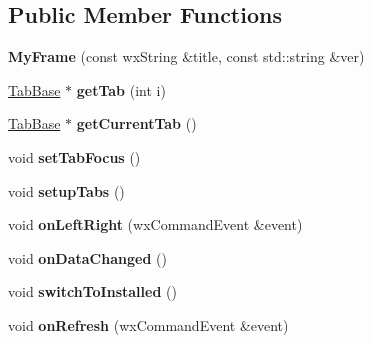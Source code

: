 \subsection*{Public Member Functions}
\begin{DoxyCompactItemize}
\item 
\hypertarget{class_my_frame_a17aed00b027b724394d8d9b54cbb11c5}{{\bfseries My\-Frame} (const wx\-String \&title, const std\-::string \&ver)}\label{class_my_frame_a17aed00b027b724394d8d9b54cbb11c5}

\item 
\hypertarget{class_my_frame_a3fe105979ec2adda44e1186fa76e3bd0}{\hyperlink{struct_tab_base}{Tab\-Base} $\ast$ {\bfseries get\-Tab} (int i)}\label{class_my_frame_a3fe105979ec2adda44e1186fa76e3bd0}

\item 
\hypertarget{class_my_frame_a35e0ed5ec58942931cfd13064491afc3}{\hyperlink{struct_tab_base}{Tab\-Base} $\ast$ {\bfseries get\-Current\-Tab} ()}\label{class_my_frame_a35e0ed5ec58942931cfd13064491afc3}

\item 
\hypertarget{class_my_frame_a1255afa204a661d6ba8d2a78323c96b4}{void {\bfseries set\-Tab\-Focus} ()}\label{class_my_frame_a1255afa204a661d6ba8d2a78323c96b4}

\item 
\hypertarget{class_my_frame_a65ad2d52518a6729a59c94f41641944d}{void {\bfseries setup\-Tabs} ()}\label{class_my_frame_a65ad2d52518a6729a59c94f41641944d}

\item 
\hypertarget{class_my_frame_a71ad5403432c811d9d58850517b937d7}{void {\bfseries on\-Left\-Right} (wx\-Command\-Event \&event)}\label{class_my_frame_a71ad5403432c811d9d58850517b937d7}

\item 
\hypertarget{class_my_frame_ac1e5030023f4ec7199a0bdc0b98372ca}{void {\bfseries on\-Data\-Changed} ()}\label{class_my_frame_ac1e5030023f4ec7199a0bdc0b98372ca}

\item 
\hypertarget{class_my_frame_a2a5cb03ea4228f4929add644f5c56f83}{void {\bfseries switch\-To\-Installed} ()}\label{class_my_frame_a2a5cb03ea4228f4929add644f5c56f83}

\item 
\hypertarget{class_my_frame_a0a68fcf35cde7bf0cc1c2c66bd7683a0}{void {\bfseries on\-Refresh} (wx\-Command\-Event \&event)}\label{class_my_frame_a0a68fcf35cde7bf0cc1c2c66bd7683a0}


\end{DoxyCompactItemize}
